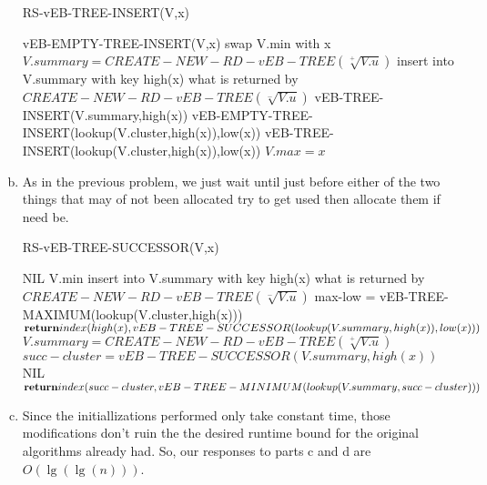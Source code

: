 \documentclass{article}
\begin{document}
\begin{enumerate}[a.]
\begin{algorithm}
\caption{RS-vEB-TREE-INSERT(V,x)}
\begin{algorithmic}
\State vEB-EMPTY-TREE-INSERT(V,x)
\Else
	\State swap V.min with x
	\EndIf
	\State $V.summary = CREATE-NEW-RD-vEB-TREE(\sqrt[+]{V.u})$
	\EndIf
	\State insert into V.summary with key high(x) what is returned by $CREATE-NEW-RD-vEB-TREE(\sqrt[-]{V.u})$
	\EndIf
	\State vEB-TREE-INSERT(V.summary,high(x))
	\State vEB-EMPTY-TREE-INSERT(lookup(V.cluster,high(x)),low(x))
	\Else
	\State vEB-TREE-INSERT(lookup(V.cluster,high(x)),low(x))
	\EndIf
	\EndIf
	\State $V.max = x$
	\EndIf
\EndIf
\end{algorithmic}
\end{algorithm}

\item

As in the previous problem, we just wait until just before either of the two things that may of not been allocated try to get used then allocate them if need be.
\begin{algorithm}
\caption{RS-vEB-TREE-SUCCESSOR(V,x)}
\begin{algorithmic}
\State {}
\Else
\State \Return NIL
\EndIf
{}
\State\Return V.min
\Else
{}
\State insert into V.summary with key high(x) what is returned by $CREATE-NEW-RD-vEB-TREE(\sqrt[-]{V.u})$
\EndIf
\State max-low = vEB-TREE-MAXIMUM(lookup(V.cluster,high(x)))
\State $\Return index(high(x),vEB-TREE-SUCCESSOR(lookup(V.summary,high(x)),low(x)))$
\Else
{}
\State $V.summary = CREATE-NEW-RD-vEB-TREE(\sqrt[+]{V.u})$
\EndIf
\State $succ-cluster = vEB-TREE-SUCCESSOR(V.summary,high(x))$
\State\Return NIL
\Else
\State $\Return index(succ-cluster,vEB-TREE-MINIMUM(lookup(V.summary,succ-cluster)))$
\EndIf
\EndIf
\EndIf
\end{algorithmic}
\end{algorithm}

\item
Since the initiallizations performed only take constant time, those modifications don't ruin the the desired runtime bound for the original algorithms already had. So, our responses to parts c and d are $O(\lg(\lg(n)))$.


\end{enumerate}
\end{document}
